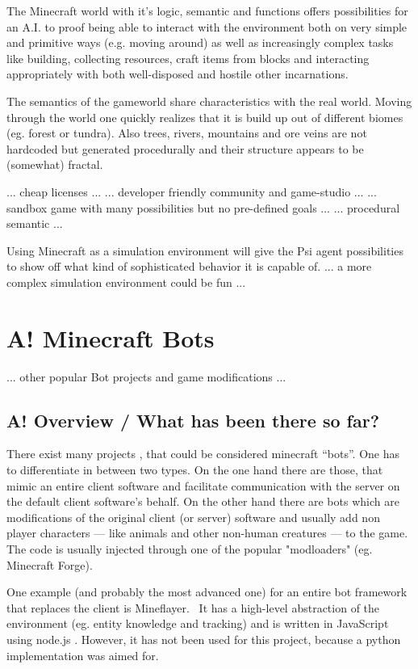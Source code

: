 The Minecraft world with it's logic, semantic and functions offers possibilities for an A.I. to proof being able to interact with the environment both on very simple and primitive ways (e.g. moving around) as well as increasingly complex tasks like building, collecting resources, craft items from blocks and interacting appropriately with both well-disposed and hostile other incarnations. %

The semantics of the gameworld share characteristics with the real world. Moving through the world one quickly realizes that it is build up out of different biomes (eg. forest or tundra). Also trees, rivers, mountains and ore veins are not hardcoded but generated procedurally and their structure appears to be (somewhat) fractal.
        
... cheap licenses ...
... developer friendly community and game-studio ...
... sandbox game with many possibilities but no pre-defined goals ...
... procedural semantic ...

Using Minecraft as a simulation environment will give the Psi agent possibilities to show off what kind of sophisticated behavior it is capable of.
... a more complex simulation environment could be fun ...

    \section{A! Minecraft Bots}
    
        ... other popular Bot projects and game modifications ...
    
        \subsection{A! Overview / What has been there so far?}
There exist many projects , that could be considered minecraft ``bots''. One has to differentiate in between two types. On the one hand there are those, that mimic an entire client software and facilitate communication with the server on the default client software's behalf. On the other hand there are bots which are modifications of the original client (or server) software and usually add non player characters --- like animals and other non-human creatures --- to the game. The code is usually injected through one of the popular "modloaders" (eg. Minecraft Forge).

One example (and probably the most advanced one) for an entire bot framework that replaces the client is Mineflayer.~\cite{github_mineflayer} It has a high-level abstraction of the environment (eg. entity knowledge and tracking) and is written in JavaScript using node.js . However, it has not been used for this project, because a python implementation was aimed for.

